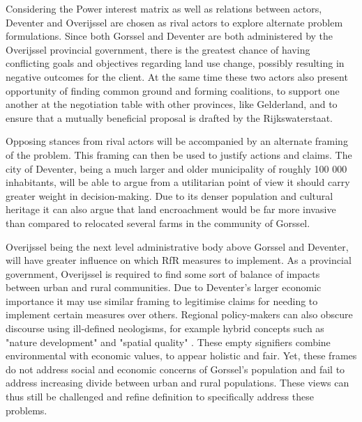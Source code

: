 Considering the Power interest matrix as well as relations between actors, Deventer and Overijssel are chosen as rival actors to explore alternate problem formulations. Since both Gorssel and Deventer are both administered by the Overijssel provincial government, there is the greatest chance of having conflicting goals and objectives regarding land use change, possibly resulting in negative outcomes for the client. At the same time these two actors also present opportunity of finding common ground and forming coalitions, to support one another at the negotiation table with other provinces, like Gelderland, and to ensure that a mutually beneficial proposal is drafted by the Rijkswaterstaat.

Opposing stances from rival actors will be accompanied by an alternate framing of the problem. This framing can then be used to justify actions and claims. The city of Deventer, being a much larger and older municipality of roughly 100 000 inhabitants, will be able to argue from a utilitarian point of view it should carry greater weight in decision-making. Due to its denser population and cultural heritage it can also argue that land encroachment would be far more invasive than compared to relocated several farms in the community of Gorssel. 

Overijssel being the next level administrative body above Gorssel and Deventer, will have greater influence on which RfR measures to implement. As a provincial government, Overijssel is required to find some sort of balance of impacts between urban and rural communities. Due to Deventer's larger economic importance it may use similar framing to legitimise claims for needing to implement certain measures over others. Regional policy-makers can also obscure discourse using ill-defined neologisms, for example hybrid concepts such as "nature development" and "spatial quality" \parencite{warner_implementing_2011}. These empty signifiers combine environmental with economic values, to appear holistic and fair. Yet, these frames do not address social and economic concerns of Gorssel's population and fail to address increasing divide between urban and rural populations. These views can thus still be challenged and refine definition to specifically address these problems.

